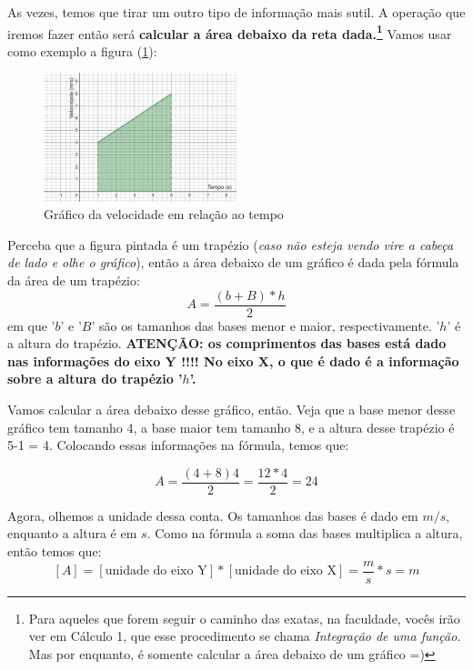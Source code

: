 \documentclass[12pt]{extarticle}
\newcommand{\<}{\langle}
\renewcommand{\>}{\rangle}
\theoremstyle{definition}
\begin{document}
As vezes, temos que tirar um outro tipo de informação mais sutil. A operação que iremos fazer então será \textbf{calcular a área debaixo da reta dada.\footnote{Para aqueles que forem seguir o caminho das exatas, na faculdade, vocês irão ver em Cálculo 1, que esse procedimento se chama \textit{Integração de uma função}. Mas por enquanto, é somente calcular a área debaixo de um gráfico =) }} Vamos usar como exemplo a figura (\ref{fig:vel_ex}):
\begin{figure}[H]
    \centering
    \includegraphics[width=0.5\textwidth]{area_under.png}
    \caption{Gráfico da velocidade em relação ao tempo}
    \label{fig:vel_ex}
\end{figure}

Perceba que a figura pintada é um trapézio (\textit{caso não esteja vendo vire a cabeça de lado e olhe o gráfico}), então a área debaixo de um gráfico é dada pela fórmula da área de um trapézio:
\begin{equation}
    A = \frac{(b+B)*h}{2}
\end{equation}
em que '$b$' e '$B$' são os tamanhos das bases menor e maior, respectivamente. '$h$' é a altura do trapézio. \textbf{ATENÇÃO: os comprimentos das bases está dado nas informações do eixo Y !!!! No eixo X, o que é dado é a informação sobre a altura do trapézio '$h$'.}

Vamos calcular a área debaixo desse gráfico, então. Veja que a base menor desse gráfico tem tamanho 4, a base maior tem tamanho 8, e a altura desse trapézio é 5-1 = 4. Colocando essas informações na fórmula, temos que:

\begin{equation}
    A = \frac{(4+8)4}{2} = \frac{12*4}{2} = 24
\end{equation}

Agora, olhemos a unidade dessa conta. Os tamanhos das bases é dado em $m/s$, enquanto a altura é em $s$. Como na fórmula a soma das bases multiplica a altura, então temos que:
\begin{equation}\label{eq:area}
    [A] = [\text{unidade do eixo Y}]*[\text{unidade do eixo X}] = \frac{m}{s}*s = m
\end{equation}
\end{document}
